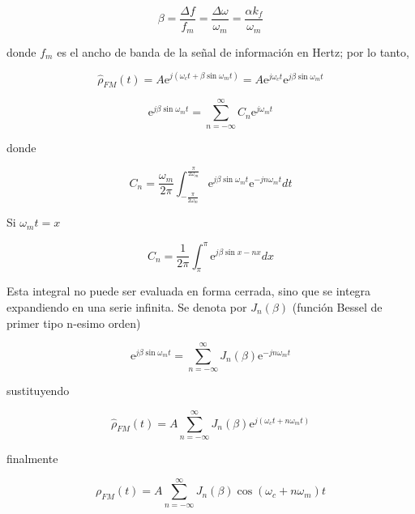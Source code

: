 \documentclass[12pt,letterpaper,titlepage,twoside]{book}
\newcommand{\me}{\mathrm{e}}
\begin{document}
\begin{equation}
\beta = \frac{\Delta f}{f_m} = \frac{\Delta \omega}{\omega_m} = \frac{\alpha k_f}{\omega_m}
\end{equation}

donde $f_m$ es el ancho de banda de la señal de información en Hertz; por lo tanto, 

\begin{equation}
\widehat{\rho}_{FM} \left( t \right)  = A \me^{j \left( \omega_c t +  \beta \sin \omega_m t \right)}  =  A \me^{j \omega_c t} \me^{j\beta \sin \omega_m t}
\end{equation}

\begin{equation}
\me^{j\beta \sin \omega_m t} = \sum_{n= -\infty}^\infty C_n \me^{j \omega_m t}
\end{equation}

donde 

\begin{equation}
C_n  = \frac{\omega_m}{2 \pi} \int_{-\frac{\pi}{2	\omega_m}}^{\frac{\pi}{2	\omega_m}} \me^{j\beta \sin \omega_m t} \me^{-jn \omega_m t} dt
\end{equation}

Si $\omega_m t = x$

\begin{equation}
C_n  = \frac{1}{2 \pi} \int_{\pi}^{\pi} \me^{j\beta \sin x - nx}  dx
\end{equation}

Esta integral no puede ser evaluada en forma cerrada, sino que se integra expandiendo en una serie infinita. Se denota por $J_n(\beta)$ (función Bessel de primer tipo n-esimo orden)


\begin{equation}
\me^{j\beta \sin \omega_m t} = \sum_{n= -\infty}^\infty J_n(\beta) \me^{-jn \omega_m t}
\end{equation}

sustituyendo 

\begin{equation}
\widehat{\rho}_{FM} \left( t \right)  = A\sum_{n= -\infty}^\infty J_n(\beta) \me^{j \left( \omega_c t +  n \omega_m t \right)}  
\end{equation}

finalmente

\begin{equation}
\rho_{FM} \left( t \right)  = A\sum_{n= -\infty}^\infty J_n(\beta) \cos \left( \omega_c  +  n \omega_m \right) t  
\end{equation}
\end{document}
